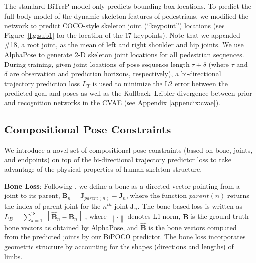 \documentclass[nohyperref]{article}
\theoremstyle{plain}
\theoremstyle{definition}
\theoremstyle{remark}
\begin{document}
\vspace{-1mm}
The standard BiTraP model only predicts bounding box locations. To predict the full body model of the dynamic skeleton features of pedestrians, we modified the network to predict COCO-style skeleton joint (``keypoint'') locations (see Figure~\ref{fig:sub1} for the location of the 17 keypoints). Note that we appended \#18, a root joint, as the mean of left and right shoulder and hip joints. We use AlphaPose \cite{fang2017rmpe, xiu2018poseflow} to generate 2-D skeleton joint locations for all pedestrian sequences. During training, given joint locations of pose sequence length $\tau+\delta$ (where $\tau$ and $\delta$ are observation and prediction horizons, respectively), a bi-directional trajectory prediction loss $L_T$ is used to minimize the L2 error between the predicted goal and poses as well as the Kullback–Leibler divergence  between prior and recognition networks in the CVAE  (see Appendix \ref{appendix:cvae}).

























\vspace{-3mm}
\subsection{Compositional Pose Constraints}
\label{sec:posecons}
\vspace{-2mm}
We introduce a novel set of  compositional pose constraints (based on bone, joints, and endpoints) on top of the bi-directional trajectory predictor loss to take advantage of the physical properties of human skeleton structure. 

\vspace{-1mm}


\textbf{Bone Loss}: Following \cite{sun2017compositional}, we define a bone as a directed vector pointing from a joint to its parent, $\mathbf{B}_{n} = {\mathbf{J}}_{parent(n)} -{\mathbf{J}}_{n}$, where the function $parent(n)$ returns the index of parent joint for the $n^{th}$ joint $\mathbf{J}_n$.  The bone-based loss is written as $L_B = \sum_{n=1}^{18} \left \| \hat{\mathbf{B}}_{n} - \mathbf{B}_{n} \right \|$,
where $\left\|\cdot \right \|$ denotes L1-norm, ${\mathbf{B}}$ is the ground truth bone vectors as obtained by AlphaPose, and  $\hat{\mathbf{B}}$ is the bone vectors computed from the predicted joints by our BiPOCO predictor. The bone loss incorporates geometric structure by accounting for the shapes (directions and lengths) of limbs.
\end{document}
